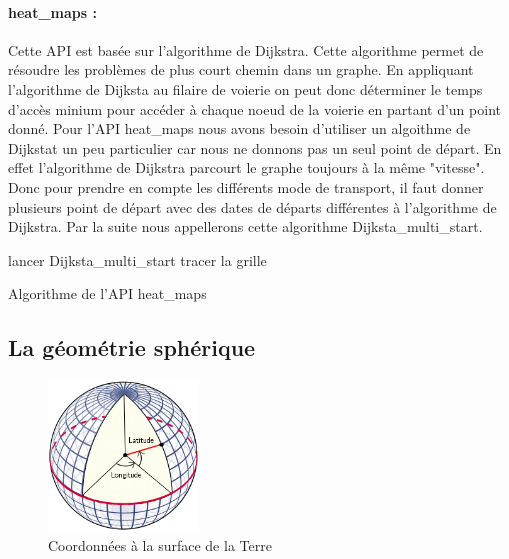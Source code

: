 \documentclass[a4paper]{report}
\begin{document}
\paragraph{heat\_maps :} Cette API est basée sur l'algorithme de Dijkstra. Cette algorithme permet de résoudre les problèmes de plus court chemin dans un graphe. En appliquant l'algorithme de Dijksta au filaire de voierie on peut donc déterminer le temps d'accès minium pour accéder à chaque noeud de la voierie en partant d'un point donné. Pour l'API heat\_maps nous avons besoin d'utiliser un algoithme de Dijkstat un peu particulier car nous ne donnons pas un seul point de départ. En effet l'algorithme de Dijkstra parcourt le graphe toujours à la même "vitesse". Donc pour prendre en compte les différents mode de transport, il faut donner plusieurs point de départ avec des dates de départs différentes à l'algorithme de Dijkstra. Par la suite nous appellerons cette algorithme Dijksta\_multi\_start.
\newline

\begin{algorithm}[H]
 lancer Dijksta\_multi\_start \;
 tracer la grille\:
 \caption{Algorithme de l'API heat\_maps}
\end{algorithm}

\subsection{La géométrie sphérique}

\begin{figure}
		\includegraphics[width=4cm]{image/lat_lon}
		\caption{Coordonnées à la surface de la Terre}
		\label{Coordonnées à la surface de la Terre}
\end{figure}
\end{document}
